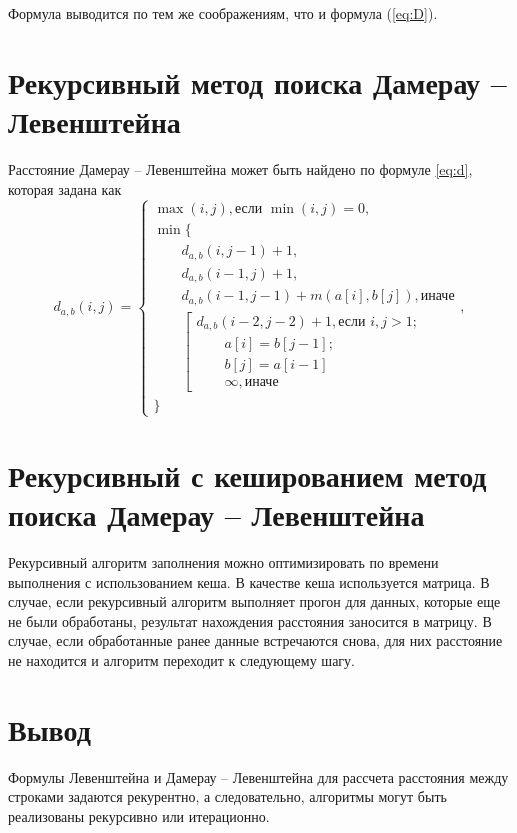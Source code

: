 Формула выводится по тем же соображениям, что и формула (\ref{eq:D}).

\section{Рекурсивный метод поиска Дамерау -- Левенштейна}
\label{sec:recmat}

Расстояние Дамерау -- Левенштейна может быть найдено по формуле \ref{eq:d}, которая задана как
\begin{equation}
	\label{eq:d}
	d_{a,b}(i, j) = \begin{cases}
		\max(i, j), \text{если }\min(i, j) = 0,\\
		\min \lbrace \\
			\qquad d_{a,b}(i, j-1) + 1,\\
			\qquad d_{a,b}(i-1, j) + 1,\\
			\qquad d_{a,b}(i-1, j-1) + m(a[i], b[j]), \text{иначе}\\
			\qquad \left[ \begin{array}{cc}d_{a,b}(i-2, j-2) + 1, \text{если }i,j > 1;\\
			\qquad \text{}a[i] = b[j-1]; \\
			\qquad \text{}b[j] = a[i-1]\\
			\qquad \infty,  \text{иначе}\end{array}\right.\\
		\rbrace
		\end{cases},
\end{equation}

\section{Рекурсивный с кешированием метод поиска Дамерау -- Левенштейна}

Рекурсивный алгоритм заполнения можно оптимизировать по времени выполнения с использованием кеша. В качестве кеша используется матрица.
В случае, если рекурсивный алгоритм выполняет прогон для данных, которые еще не были обработаны, результат нахождения расстояния заносится в матрицу. В случае, если обработанные ранее данные встречаются снова, для них расстояние не находится и алгоритм переходит к следующему шагу.


\section*{Вывод}

Формулы Левенштейна и Дамерау -- Левенштейна для рассчета расстояния между строками задаются рекурентно, а следовательно, алгоритмы могут быть реализованы рекурсивно или итерационно.


